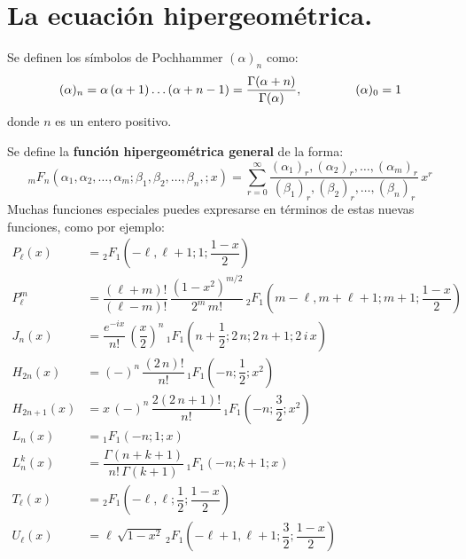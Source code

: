 \section{La ecuación hipergeométrica.}
Se definen los símbolos de Pochhammer $(\alpha)_{n}$ como:
\[ (\alpha)_{n} = \alpha \, (\alpha + 1) \ldots (\alpha + n -1) = \dfrac{\Gamma (\alpha + n)}{\Gamma (\alpha)}, \hspace{1.5cm} (\alpha)_{0} = 1 \]
donde $n$ es un entero positivo.
\par
Se define la \textbf{función hipergeométrica general} de la forma:
\begin{equation}
{}_{m}F_{n} (\alpha_{1}, \alpha_{2}, \ldots, \alpha_{m}; \beta_{1}, \beta_{2}, \ldots, \beta_{n},; x) = \sum_{r=0}^{\infty} \dfrac{(\alpha_{1})_{r}, (\alpha_{2})_{r}, \ldots, (\alpha_{m})_{r}}{(\beta_{1})_{r}, (\beta_{2})_{r}, \ldots, (\beta_{n})_{r}} \, x^{r}
\label{eq:ecuacion_08_91}
\end{equation}
Muchas funciones especiales puedes expresarse en términos de estas nuevas funciones, como por ejemplo:
\begin{align*}
P_{\ell} (x) &= {}_{2}F_{1} \left( -\ell , \ell + 1; 1; \dfrac{1 - x}{2} \right) \\[1em]
P_{\ell}^{m} &= \dfrac{(\ell + m)!}{(\ell - m)!} \, \dfrac{(1 - x^{2})^{m/2}}{2^{m} \, m!} \, {}_{2}F_{1} \left( m - \ell, m + \ell + 1; m + 1; \dfrac{1 - x}{2} \right) \\[1em]
J_{n} (x) &= \dfrac{e^{-i x}}{n!} \, \left( \dfrac{x}{2} \right)^{n} \, {}_1 F_{1} \left( n + \dfrac{1}{2}; 2 \, n; 2 \, n + 1; 2 \, i \, x \right) \\[1em]
H_{2 n} (x) &= (-)^{n} \, \dfrac{(2 \, n)!}{n!} \, {}_1 F_{1} \left( -n; \dfrac{1}{2}; x^{2} \right) \\[1em]
H_{2 n+1} (x) &= x \, (-)^{n} \, \dfrac{2 (2 \, n + 1)!}{n!} \, {}_1 F_{1} \left( -n; \dfrac{3}{2}; x^{2}\right) \\[1em]
L_{n} (x) &= {}_{1} F_{1} (-n; 1; x)\\[1em]
L_{n}^{k} (x) &= \dfrac{\Gamma (n +  k + 1)}{n! \, \Gamma (k + 1)} \, {}_{1} F_{1} (-n; k + 1; x) \\[1em]
T_{\ell} (x) &= {}_{2} F_{1} \left( -\ell, \ell; \dfrac{1}{2}; \dfrac{1 - x}{2} \right) \\[1em]
U_{\ell}(x) &= \ell \,\sqrt{1- x^{2}} \, {}_{2} F_{1} \left( -\ell + 1, \ell+1; \dfrac{3}{2}; \dfrac{1-x}{2} \right)
\end{align*}
